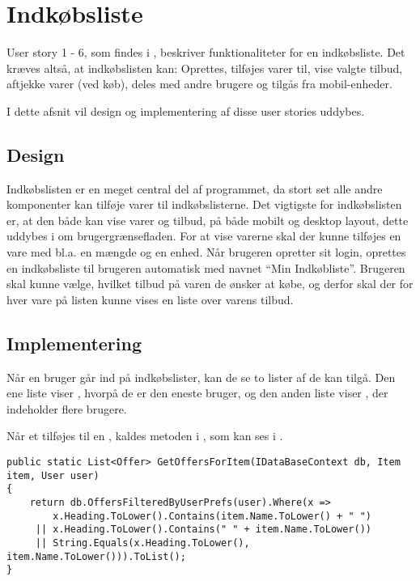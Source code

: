 \section{Indkøbsliste} \label{Indkoebsliste}
User story 1 - 6, som findes i , beskriver funktionaliteter for en indkøbsliste.
Det kræves altså, at indkøbslisten kan: Oprettes, tilføjes varer til, vise valgte tilbud, aftjekke varer (ved køb), deles med andre brugere og tilgås fra mobil-enheder.

I dette afsnit vil design og implementering af disse user stories uddybes.

\subsection{Design}
Indkøbslisten er en meget central del af programmet, da stort set alle andre komponenter kan tilføje varer til indkøbslisterne.
Det vigtigste for indkøbslisten er, at den både kan vise varer og tilbud, på både mobilt og desktop layout, dette uddybes i  om brugergrænsefladen.
For at vise varerne skal der kunne tilføjes en vare med bl.a. en mængde og en enhed.
Når brugeren opretter sit login, oprettes en indkøbsliste til brugeren automatisk med navnet ``Min Indkøbliste''.
Brugeren skal kunne vælge, hvilket tilbud på varen de ønsker at købe, og derfor skal der for hver vare på listen kunne vises en liste over varens tilbud.

\subsection{Implementering}
Når en bruger går ind på indkøbslister, kan de se to lister af  de kan tilgå.
Den ene liste viser , hvorpå de er den eneste bruger, og den anden liste viser , der indeholder flere brugere.

Når et  tilføjes til en , kaldes metoden  i , som kan ses i .

\begin{lstlisting}[caption={Metoden \class{GetOffersForItem} finder relevante tilbud og returner dem som en liste}, label=getoffersforitem]
public static List<Offer> GetOffersForItem(IDataBaseContext db, Item item, User user)
{
    return db.OffersFilteredByUserPrefs(user).Where(x => 
     	x.Heading.ToLower().Contains(item.Name.ToLower() + " ") 
     || x.Heading.ToLower().Contains(" " + item.Name.ToLower()) 
     || String.Equals(x.Heading.ToLower(), item.Name.ToLower())).ToList();
}
\end{lstlisting}

